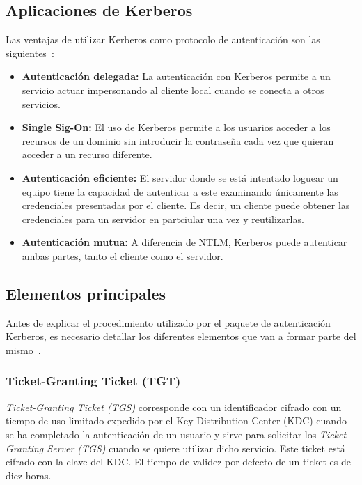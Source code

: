 \subsection{Aplicaciones de Kerberos}

Las ventajas de utilizar Kerberos como protocolo de autenticación son las siguientes~\cite{Capitulo3:Kerberos3}:

\begin{itemize}
\item \textbf{Autenticación delegada:} La autenticación con Kerberos permite a un servicio actuar impersonando al cliente local cuando se conecta a otros servicios.
\item \textbf{Single Sig-On:} El uso de Kerberos permite a los usuarios acceder a los recursos de un dominio sin introducir la contraseña cada vez que quieran acceder a un recurso diferente.
\item \textbf{Autenticación eficiente:} El servidor donde se está intentado loguear un equipo tiene la capacidad de autenticar a este examinando únicamente las credenciales presentadas por el cliente. Es decir, un cliente puede obtener las credenciales para un servidor en partciular una vez y reutilizarlas. 
\item \textbf{Autenticación mutua:} A diferencia de NTLM, Kerberos puede autenticar ambas partes, tanto el cliente como el servidor. 
\end{itemize}

\subsection{Elementos principales}

Antes de explicar el procedimiento utilizado por el paquete de autenticación Kerberos, es necesario detallar los diferentes elementos que van a formar parte del mismo~\cite{Capitulo3:Kerberos4}. 

\subsubsection{Ticket-Granting Ticket (TGT)}

{\it Ticket-Granting Ticket (TGS)} corresponde con un identificador cifrado con un tiempo de uso limitado expedido por el Key Distribution Center (KDC) cuando se ha completado la autenticación de un usuario y sirve para solicitar los {\it Ticket-Granting Server (TGS)} cuando se quiere utilizar dicho servicio. Este ticket está cifrado con la clave del KDC. El tiempo de validez por defecto de un ticket es de diez horas. 

